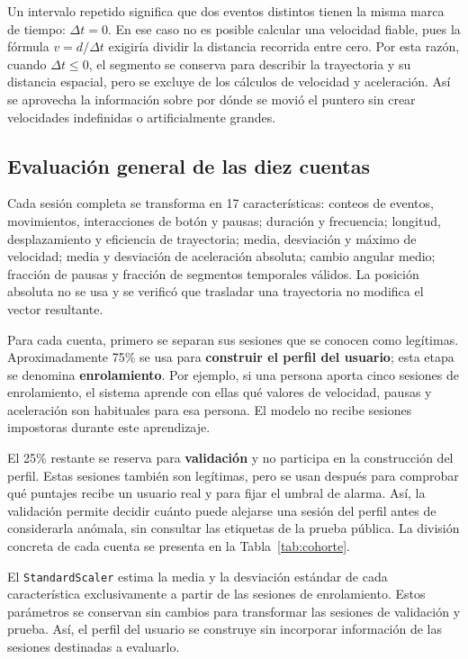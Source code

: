 \documentclass[11pt,letterpaper]{article}
\begin{document}
Un intervalo repetido significa que dos eventos distintos tienen la misma marca de tiempo: $\Delta t=0$. En ese caso
no es posible calcular una velocidad fiable, pues la fórmula $v=d/\Delta t$ exigiría dividir la distancia recorrida
entre cero. Por esta razón, cuando $\Delta t\leq0$, el segmento se conserva para describir la trayectoria y su
distancia espacial, pero se excluye de los cálculos de velocidad y aceleración. Así se aprovecha la información sobre
por dónde se movió el puntero sin crear velocidades indefinidas o artificialmente grandes.

\subsection{Evaluación general de las diez cuentas}

Cada sesión completa se transforma en 17 características: conteos de eventos, movimientos, interacciones de botón y
pausas; duración y frecuencia; longitud, desplazamiento y eficiencia de trayectoria; media, desviación y máximo de
velocidad; media y desviación de aceleración absoluta; cambio angular medio; fracción de pausas y fracción de
segmentos temporales válidos. La posición absoluta no se usa y se verificó que trasladar una trayectoria no modifica
el vector resultante.

Para cada cuenta, primero se separan sus sesiones que se conocen como legítimas. Aproximadamente 75\% se usa para
\textbf{construir el perfil del usuario}; esta etapa se denomina \textbf{enrolamiento}. Por ejemplo, si una persona
aporta cinco sesiones de enrolamiento, el sistema aprende con ellas qué valores de velocidad, pausas y aceleración son
habituales para esa persona. El modelo no recibe sesiones impostoras durante este aprendizaje.

El 25\% restante se reserva para \textbf{validación} y no participa en la construcción del perfil. Estas sesiones
también son legítimas, pero se usan después para comprobar qué puntajes recibe un usuario real y para fijar el umbral
de alarma. Así, la validación permite decidir cuánto puede alejarse una sesión del perfil antes de considerarla
anómala, sin consultar las etiquetas de la prueba pública. La división concreta de cada cuenta se presenta en la
Tabla~\ref{tab:cohorte}.

El \texttt{StandardScaler} estima la media y la desviación estándar de cada característica exclusivamente a partir de
las sesiones de enrolamiento. Estos parámetros se conservan sin cambios para transformar las sesiones de validación y
prueba. Así, el perfil del usuario se construye sin incorporar información de las sesiones destinadas a evaluarlo.
\end{document}

